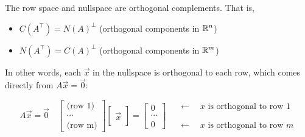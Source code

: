 \documentclass{article}
\begin{document}
\begin{theorem}
	The \@{row space} and \@{nullspace} are orthogonal complements. That is,
	\begin{itemize}
		\item $C(A^\top) = N(A)^\perp$ (orthogonal components in $\mathbb{R}^n$)
		\item $N(A^\top) = C(A)^\perp$ (orthogonal components in $\mathbb{R}^m$)
	\end{itemize}

	In other words, each $\vec{x}$ in the nullspace is orthogonal to each row, which comes directly from $A\vec{x} = \vec{0}:$

	\[ A\vec{x} = \vec{0} \quad \begin{bmatrix} \text{(row 1)} \\ \cdots \\ \text{(row m)} \end{bmatrix}
		\begin{bmatrix} \text{ } \\ \vec{x} \\ \text{ } \end{bmatrix}
	       = \begin{bmatrix} 0 \\ \cdots \\ 0 \end{bmatrix}
		       \quad
           \begin{array}{l}
           \longleftarrow\quad x \text{ is orthogonal to row 1}\\
		   \\ \text{ } \\
           \longleftarrow\quad x \text{ is orthogonal to row }m
           \end{array}
	\]
\end{theorem}
\end{document}

